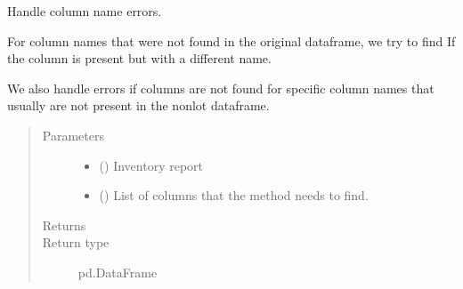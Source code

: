 \documentclass[letterpaper,10pt,english]{sphinxmanual}
\begin{document}
\begin{fulllineitems}
\label{\detokenize{source/optimization.datatools:optimization.datatools.dataprep.columns_error_handling}}
Handle column name errors.

For column names that were not found     in the original dataframe, we try to find If     the column is present but with a different name.

We also handle errors if columns are not found for specific     column names that usually are not present in the non\sphinxhyphen{}lot dataframe.
\begin{quote}\begin{description}
\item[{Parameters}] \leavevmode\begin{itemize}
\item {} 
 () \textendash{} Inventory report

\item {} 
 () \textendash{} List of columns that the method needs to find.

\end{itemize}

\item[{Returns}] \leavevmode
{}

\item[{Return type}] \leavevmode
pd.DataFrame

\end{description}\end{quote}

\end{fulllineitems}

\end{document}
